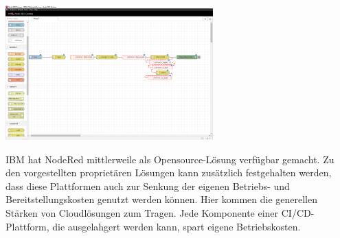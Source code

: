 \begin{center}
    \includegraphics[width=0.6\textwidth]{Grafiken/NodeRed_Flow.png}
    \label{Grafik:Beispielhafter Flow in der NodeRed-Desktopversion}
\end{center}
IBM hat NodeRed mittlerweile als Opensource-Lösung verfügbar gemacht. 
Zu den vorgestellten proprietären Lösungen kann zusätzlich festgehalten werden, dass diese Plattformen auch zur Senkung der eigenen Betriebs- und Bereitstellungskosten genutzt werden können. Hier kommen die generellen Stärken von Cloudlösungen zum Tragen. Jede Komponente einer \acrshort{CI}/\acrshort{CD}-Plattform, die ausgelahgert werden kann, spart eigene Betriebskosten.